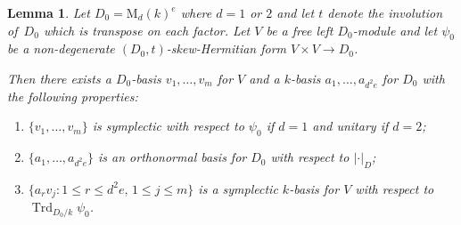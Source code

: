 \documentclass[JEP,XML,SOM,Unicode,NoFloatCountersInSection]{cedram}
\newenvironment{enumeratei}
{\bgroup\def\theenumi{\roman{enumi}}\def\theenumii{\alph{enumii}}\begin{enumerate}}
{\end{enumerate}\egroup}
\newcommand{\rM}{\mathrm{M}}
\DeclareMathOperator{\Trd}{Trd}
\newcommand{\abs}[1]{\lvert #1 \rvert}
\newtheorem{lemma}{Lemma}[section]
\begin{document}
\begin{lemma} \label{D0-basis}
Let $D_0 = \rM_d(k)^e$ where $d = 1$ or $2$ and let $t$ denote the involution of~$D_0$ which is transpose on each factor.
Let $V$ be a free left $D_0$-module and let $\psi_0$ be a non-degenerate $(D_0,t)$-skew-Hermitian form $V \times V \to D_0$.

Then there exists a $D_0$-basis $v_1, \dotsc, v_m$ for $V$ and a $k$-basis $a_1, \dotsc, a_{d^2e}$ for $D_0$ with the following properties:
\begin{enumeratei}
\item\label{D0-basisi} $\{ v_1, \dotsc, v_m \}$ is symplectic with respect to $\psi_0$ if $d=1$ and unitary if $d=2$;
\item\label{D0-basisii} $\{ a_1, \dotsc, a_{d^2e} \}$ is an orthonormal basis for $D_0$ with respect to $\abs{\cdot}_D$;
\item\label{D0-basisiii} $\{ a_r v_j : 1 \leq r \leq d^2e,\, 1 \leq j \leq m \}$ is a symplectic $k$-basis for $V$ with respect to $\Trd_{D_0/k} \psi_0$.
\end{enumeratei}
\end{lemma}
\end{document}
